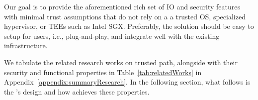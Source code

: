 
Our goal is to provide the aforementioned rich set of IO and security features with minimal trust assumptions that do not rely on a a trusted OS, specialized hypervisor, or TEEs such as Intel SGX. Preferably, the solution should be easy to setup for users, i.e., plug-and-play, and integrate well with the existing infrastructure.  

We tabulate the related research works on trusted path, alongside with their security and functional properties in Table~\ref{tab:relatedWorks} in Appendix~\ref{appendix:summaryResearch}. In the following section, what follows is the \name's design and how \name achieves these properties.